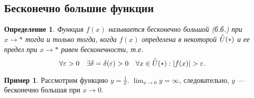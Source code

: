 \documentclass[a4paper,12pt]{article} %
\newtheorem{definition}{Определение}[section]
\theoremstyle{remark}
\theoremstyle{definition}
\newtheorem{exmp}{Пример}[section]
\begin{document}
\subsection{Бесконечно большие функции}
\begin{definition}
	Функция $f(x)$ называется бесконечно большой (б.б.) при $x\to *$ тогда и только тогда, когда $f(x)$ определена в некоторой $\accentset{\circ}{U}(*)$ и ее предел при $x\to *$ равен бесконечности, т.е.
	\[
	\forall \varepsilon>0 \quad \exists \delta=\delta(\varepsilon)>0 \quad \forall x\in \accentset{\circ}{U}(*) : |f(x)| > \varepsilon
	.\] 
\end{definition}
\begin{exmp}
	Рассмотрим функцию $y=\frac{1}{x}$. $\displaystyle \lim_{x \to 0} y = \infty$, следовательно,
    $y$ --- бесконечно большая при $x\to 0$.
\end{exmp}
\end{document}
